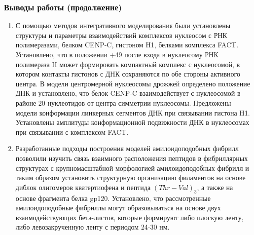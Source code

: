 \begin{frame}%
    \frametitle{Выводы работы (продолжение)}

\begin{enumerate}
\justifying
\scriptsize

  \item С помощью методов интегративного моделирования были установлены структуры и параметры взаимодействий комплексов нуклеосом с РНК полимеразами, белком CENP-C, гистоном H1, белками комплекса FACT. Установлено, что в положении +49 после входа в нуклеосому РНК полимераза II может формировать компактный комплекс с нуклеосомой, в котором контакты гистонов с ДНК сохраняются по обе стороны активного центра. В модели центромерной нуклеосомы дрожжей определено положение ДНК и установлено, что белок CENP-C взаимодействует с нуклеосомой в районе 20 нуклеотидов от центра симметрии нуклеосомы. Предложены модели конформации линкерных сегментов ДНК при связывании гистона H1.  Установлены амплитуды конформационной подвижности ДНК в нуклеосомах при связывании с комплексом FACT.
  

 \item Разработанные подходы построения моделей амилоидоподобных фибрилл позволили изучить связь взаимного расположения пептидов в фибриллярных структурах с крупномасштабной морфологией амилоидоподобных фибрилл и таким образом установить структурную организацию филаментов на основе диблок олигомеров кватертиофена и пептида $(Thr-Val)_3$, а также на основе фрагмента белка gp120. Установлено, что рассмотренные амилоидоподобные фибриллы могут образовываться на основе двух взаимодействующих бета-листов, которые формируют либо плоскую ленту, либо левозакрученную ленту с периодом 24-30 нм.

\end{enumerate}
\end{frame}


